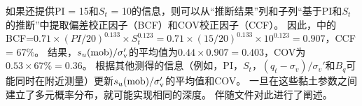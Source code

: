 \begin{Parallel}{0.60\textwidth}{}
{    }
    \ParallelRText
    {
        如果还提供PI = 15和$S_t$ = 10的信息，则可以从“推断结果”列和子列“基于PI和$S_t$的推断”中提取偏差校正因子（BCF）和COV校正因子（CCF）。 因此，中的BCF=$0.71\times{}(PI/20)^{0.133}\times{}S_t^{0.123} = 0.71\times{}(15/20)^{0.133}\times{}10^{0.123} = 0.907$，CCF = 67$\%$。 结果，$s_u(\rm{mob})/\sigma_v'$的平均值为$0.44\times{}0.907 = 0.403$，COV为$0.53\times{}67\%= 0.36$。 根据其他测得的信息（例如，PI，$S_t$，$(q_t-\sigma_v)/\sigma_v'$和$B_q$可能同时在附近测量）更新$s_u(\rm{mob})/\sigma_v'$的平均值和COV。 一旦在这些黏土参数之间建立了多元概率分布，就可能实现相同的深度。 伴随文件对此进行了阐述\citep{Ching2014686}。
    }
\end{Parallel}